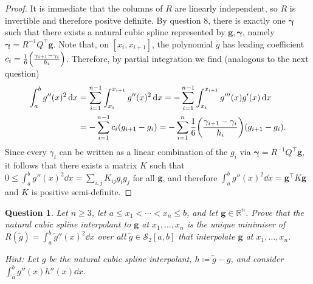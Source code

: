 \documentclass{article}
\theoremstyle{plain}
\newtheorem{question}{Question}
\theoremstyle{remark}
\renewcommand{\vec}{\boldsymbol}
\newcommand{\Bb}{\mathbb}
\newcommand{\Cal}{\mathcal}
\newcommand{\RR}{\Bb R}
\renewcommand\SS{\Cal S}
\newcommand{\T}{^\top} %
\newcommand\ceq\coloneqq %
\begin{document}
\begin{proof}
	It is immediate that the columns of $R$ are linearly independent, so $R$ is invertible and therefore positve definite. By question 8, there is exactly one $\vec \gamma$ such that there exists a natural cubic spline represented by $\vec g, \vec \gamma$, namely $\vec \gamma = R^{-1} Q\T \vec g$. 
	Note that, on $[x_i, x_{i+1}]$, the polynomial $g$ has leading coefficient $c_i = \frac16 \qty(\frac{\gamma_{i+1} - \gamma_i}{h_i})$. Therefore, by partial integration we find (analogous to the next question)
	\begin{align*}
		\int_a^b g''(x)^2 \dd{x} &= \sum_{i=1}^{n-1}\int_{x_i}^{x_{i+1}} g''(x)^2 \dd{x} = -\sum_{i=1}^{n-1} \int_{x_i}^{x_{i+1}} g'''(x) g'(x) \dd{x} \\
		&= - \sum_{i=1}^{n-1} c_i \qty(g_{i+1} - g_i) = - \sum_{i=1}^n \frac16 \qty(\frac{\gamma_{i+1} - \gamma_i}{h_i}) (g_{i+1} - g_i). 
	\end{align*}
Since every $\gamma_i$ can be written as a linear combination of the $g_i$ via $\vec \gamma = R^{-1}Q\T \vec g$, it follows that there exists a matrix $K$ such that $0 \leq \int_a^b g''(x)^2 \dd{x} = \sum_{i, j} K_{ij} g_i g_j$ for all $\vec g$, and therefore $\int_a^b g''(x)^2 \dd{x} = \vec g\T K\vec g$ and $K$ is positive semi-definite. 
\end{proof}
\begin{question}
Let $n \geq 3$, let $a \leq x_1 < \dotsb < x_n \leq b$, and let $\vec g \in \RR^n$. Prove that the natural cubic spline interpolant to $\vec g$ at $x_1, \dotsc, x_n$ is the unique minimiser of $R(\tilde g) = \int_a^b \tilde g''(x)^2 \dd{x}$ over all $\tilde g \in \SS_2[a, b]$ that interpolate $\vec g$ at $x_1, \dotsc, x_n$. 

\emph{Hint:} Let $g$ be the natural cubic spline interpolant, $h \ceq \tilde g - g$, and consider $\int_a^b g''(x) h''(x) \dd{x}$. 
\end{question}
\end{document}

